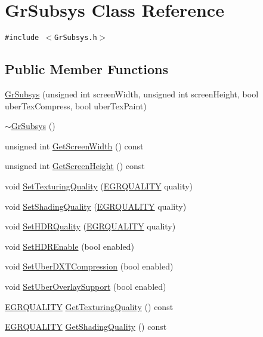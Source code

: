 \hypertarget{class_gr_subsys}{
\section{GrSubsys Class Reference}
\label{class_gr_subsys}
}
{\tt \#include $<$GrSubsys.h$>$}

\subsection*{Public Member Functions}
\begin{CompactItemize}
\item 
\hyperlink{class_gr_subsys_96c2a23cef6078de5a5982ae9c23dfae}{GrSubsys} (unsigned int screenWidth, unsigned int screenHeight, bool uberTexCompress, bool uberTexPaint)
\item 
\hyperlink{class_gr_subsys_1fe11cc4b9217dcf96f4e712a467e4b8}{$\sim$GrSubsys} ()
\item 
unsigned int \hyperlink{class_gr_subsys_0b72dbb98da668bbbc0cc46038b804e5}{GetScreenWidth} () const 
\item 
unsigned int \hyperlink{class_gr_subsys_ebabe946b174172886fc4370dc755257}{GetScreenHeight} () const 
\item 
void \hyperlink{class_gr_subsys_7950bbebe8c3f42e7048aaedd61512eb}{SetTexturingQuality} (\hyperlink{enums_8h_697c1ee1354746841860d5bf9f81c033}{EGRQUALITY} quality)
\item 
void \hyperlink{class_gr_subsys_98502732472ab7e6ec14048fbd25d240}{SetShadingQuality} (\hyperlink{enums_8h_697c1ee1354746841860d5bf9f81c033}{EGRQUALITY} quality)
\item 
void \hyperlink{class_gr_subsys_c9626c59833220674cfc79155127947f}{SetHDRQuality} (\hyperlink{enums_8h_697c1ee1354746841860d5bf9f81c033}{EGRQUALITY} quality)
\item 
void \hyperlink{class_gr_subsys_f116de3127fd9378c506fe73dbd1eb4d}{SetHDREnable} (bool enabled)
\item 
void \hyperlink{class_gr_subsys_4def4c86d374f56b9d193fa851bcf8b5}{SetUberDXTCompression} (bool enabled)
\item 
void \hyperlink{class_gr_subsys_84c66e7b8a09731997e82f7f743cb625}{SetUberOverlaySupport} (bool enabled)
\item 
\hyperlink{enums_8h_697c1ee1354746841860d5bf9f81c033}{EGRQUALITY} \hyperlink{class_gr_subsys_45b6a0acd149993f18e157414788ed8d}{GetTexturingQuality} () const 
\item 
\hyperlink{enums_8h_697c1ee1354746841860d5bf9f81c033}{EGRQUALITY} \hyperlink{class_gr_subsys_66edbd30a3f1d39b73eb00df33f89404}{GetShadingQuality} () const 

\end{CompactItemize}
